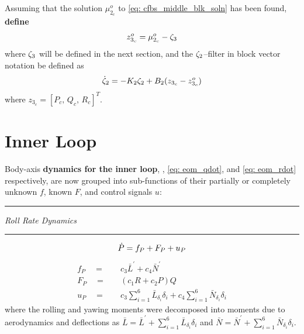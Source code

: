 \documentclass[12pt]{ucthesis}
\begin{document}
Assuming that the solution $\mu^o_{2_c}$ to \autoref{eq: cfbs_middle_blk_soln} has been found, \textbf{define}
	\begin{equation} \label{eq: cfbs_middle_def}
		z^o_{3_c} = \mu^o_{2_c} - \zeta_3
	\end{equation}
where $\zeta_3$ will be defined in the next section, and the $\zeta_2$--filter in block vector notation be defined as
	\begin{equation} \label{eq: cfbs_middle_blk_filt}
		\dot{\zeta}_2 = -K_2 \zeta_2 + B_2(z_{3_c} - z^o_{3_c})
	\end{equation}
where $z_{3_c} = [P_c,\,Q_c,\,R_c]^T$. 

\section{Inner Loop}
\label{sec: uav_inner_loop}
%
Body-axis \textbf{dynamics for the inner loop}, , \ref{eq: eom_qdot}, and \ref{eq: eom_rdot} respectively, are now grouped into sub-functions of their partially or completely unknown $f$, known $F$, and control signals $u$:

\begin{center} {\color{lightgray}\rule[2pt]{2.25in}{1pt}} \noindent \textit{Roll Rate Dynamics} {\color{lightgray}\rule[2pt]{2.25in}{1pt}}  \end{center}
	\begin{equation}
		\dot{P} = f_P + F_P + u_P \\
		\label{eq: cfbs_pdot}
	\end{equation}
	\begin{align}
		\label{eq: cfbs_fP} f_P \quad = & \quad 	c_3 \bar{L}^{'} + c_4 \bar{N}^{'}\\
		\label{eq: cfbs_FP} F_P \quad = & \quad 	\left(c_1 R + c_2 P \right)Q\\
		\label{eq: cfbs_uP} u_P \quad = & \quad 	c_3 \sum\limits_{i=1}^6 \bar{L}_{\delta_i} \delta_i + c_4 \sum\limits_{i=1}^6 \bar{N}_{\delta_i} \delta_i
	\end{align}
where the rolling and yawing moments were decomposed into moments due to aerodynamics and deflections as  $\bar{L} = \bar{L}^{'} + \sum_{i=1}^6 \bar{L}_{\delta_i} \delta_i$ and $\bar{N} = \bar{N}^{'} + \sum_{i=1}^6 \bar{N}_{\delta_i} \delta_i$.
\end{document}

